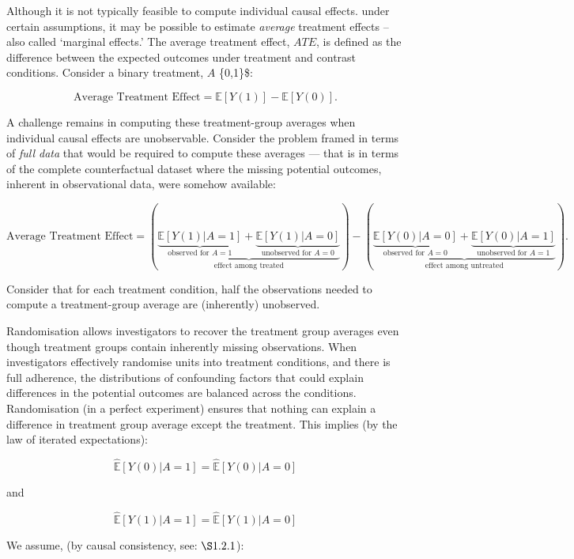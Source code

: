 \documentclass[
  singlecolumn]{article}
\begin{document}
Although it is not typically feasible to compute individual causal
effects. under certain assumptions, it may be possible to estimate
\emph{average} treatment effects -- also called `marginal effects.' The
average treatment effect, \(ATE\), is defined as the difference between
the expected outcomes under treatment and contrast conditions. Consider
a binary treatment, \(A\) \in \{0,1\}\$:

\[
\text{Average Treatment Effect}  = \mathbb{E}[Y(1)] - \mathbb{E}[Y(0)].
\]

A challenge remains in computing these treatment-group averages when
individual causal effects are unobservable. Consider the problem framed
in terms of \emph{full data} that would be required to compute these
averages --- that is in terms of the complete counterfactual dataset
where the missing potential outcomes, inherent in observational data,
were somehow available:

\[
\text{Average Treatment Effect} = \left(\underbrace{\underbrace{\mathbb{E}[Y(1)|A = 1]}_{\text{observed for } A = 1} + \underbrace{\mathbb{E}[Y(1)|A = 0]}_{\text{unobserved for } A = 0}}_{\text{effect among treated}}\right) - \left(\underbrace{\underbrace{\mathbb{E}[Y(0)|A = 0]}_{\text{observed for } A = 0} + \underbrace{\mathbb{E}[Y(0)|A = 1]}_{\text{unobserved for } A = 1}}_{\text{effect among untreated}}\right).
\]

Consider that for each treatment condition, half the observations needed
to compute a treatment-group average are (inherently) unobserved.

Randomisation allows investigators to recover the treatment group
averages even though treatment groups contain inherently missing
observations. When investigators effectively randomise units into
treatment conditions, and there is full adherence, the distributions of
confounding factors that could explain differences in the potential
outcomes are balanced across the conditions. Randomisation (in a perfect
experiment) ensures that nothing can explain a difference in treatment
group average except the treatment. This implies (by the law of iterated
expectations):

\[
\widehat{\mathbb{E}}[Y(0) | A = 1] = \widehat{\mathbb{E}}[Y(0) | A = 0]
\]

and

\[
\widehat{\mathbb{E}}[Y(1) | A = 1] = \widehat{\mathbb{E}}[Y(1) | A = 0]
\]

We assume, (by causal consistency, see: \(\S 1.2.1\)):
\end{document}
